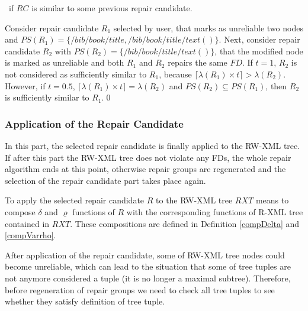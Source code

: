 \begin{algorithm}
\caption{$canBeUsedUserSelection(SR, t, RC)$}
\label{canUserSel}
\begin{algorithmic}[1]
\REQUIRE{\ \\
$SR$: the set of previously selected repair candidates by the user\\
$t$: a suitability threshold $(0,1]$ of previously selected repair candidates\\
$RC$: the current repair candidate}
\ENSURE \TRUE\ if $RC$ is similar to some previous repair candidate.
            \RETURN \TRUE
        \ENDIF
            \RETURN \TRUE
        \ENDIF
   \ENDIF
\ENDFOR
\RETURN \FALSE
\end{algorithmic}
\end{algorithm}

\begin{example}\label{tresholdExample}
Consider repair candidate $R_1$ selected by user, that marks as unreliable two nodes and $PS(R_1) = \{/bib/book/title, /bib/book/title/text()\}$. Next, consider repair candidate $R_2$ with $PS(R_2) = \{/bib/book/title/text()\}$, that the modified node is marked as unreliable and both $R_1$ and $R_2$ repairs the same $FD$. If $t=1$, $R_2$ is not considered as sufficiently similar to $R_1$, because $\lceil\lambda(R_1) \times t\rceil > \lambda(R_2)$. However, if $t=0.5$, $\lceil\lambda(R_1) \times t\rceil = \lambda(R_2)$ and $PS(R_2) \subseteq PS(R_1)$, then $R_2$ is sufficiently similar to $R_1$.\qed
\end{example}

\subsubsection{Application of the Repair Candidate}

In this part, the selected repair candidate is finally applied to the RW-XML tree. If after this part the RW-XML tree does not violate any FDs, the whole repair algorithm ends at this point, otherwise repair groups are regenerated and the selection of the repair candidate part takes place again.

To apply the selected repair candidate $R$ to the RW-XML tree $RXT$ means to compose $\delta$ and $\varrho$ functions of $R$ with the corresponding functions of R-XML tree contained in $RXT$. These compositions are defined in Definition \ref{compDelta} and \ref{compVarrho}.

After application of the repair candidate, some of RW-XML tree nodes could become unreliable, which can lead to the situation that some of tree tuples are not anymore considered a tuple (it is no longer a maximal subtree). Therefore, before regeneration of repair groups we need to check all tree tuples to see whether they satisfy definition of tree tuple.
